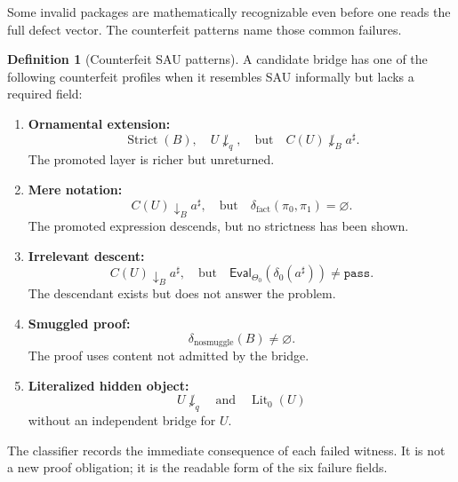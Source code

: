 \documentclass[11pt]{article}
\newcommand{\Lit}{\operatorname{Lit}}
\theoremstyle{definition}
\newtheorem{definition}[theorem]{Definition}
\begin{document}
Some invalid packages are mathematically recognizable even before one reads the
full defect vector.  The counterfeit patterns name those common failures.

\begin{definition}[Counterfeit SAU patterns]
\label{def:sau-counterfeit-patterns}
A candidate bridge has one of the following counterfeit profiles when it resembles SAU informally but lacks a required field:
\begin{enumerate}
\item \textbf{Ornamental extension:}
\[
\operatorname{Strict}(B),\quad U\not\downarrow_q,
\quad\text{but}\quad C(U)\not\downarrow_B a^\sharp.
\]
The promoted layer is richer but unreturned.
\item \textbf{Mere notation:}
\[
C(U)\downarrow_B a^\sharp,
\quad\text{but}\quad
\delta_{\mathrm{fact}}(\pi_0,\pi_1)=\varnothing.
\]
The promoted expression descends, but no strictness has been shown.
\item \textbf{Irrelevant descent:}
\[
C(U)\downarrow_B a^\sharp,
\quad\text{but}\quad
\mathsf{Eval}_{\Theta_0}(\delta_0(a^\sharp))\neq\texttt{pass}.
\]
The descendant exists but does not answer the problem.
\item \textbf{Smuggled proof:}
\[
\delta_{\mathrm{nosmuggle}}(B)\neq\varnothing.
\]
The proof uses content not admitted by the bridge.
\item \textbf{Literalized hidden object:}
\[
U\not\downarrow_q
\quad\text{and}\quad
\Lit_0(U)
\]
without an independent bridge for \(U\).
\end{enumerate}
\end{definition}

The classifier records the immediate consequence of each failed witness.  It is
not a new proof obligation; it is the readable form of the six failure fields.
\end{document}
